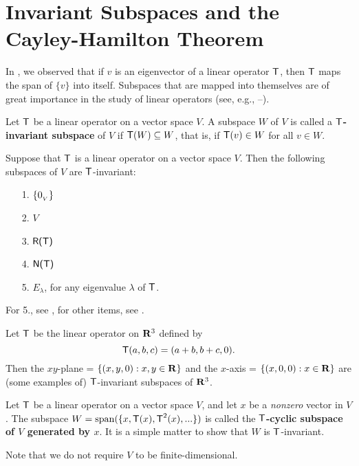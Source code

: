 \section{Invariant Subspaces and the Cayley-Hamilton Theorem} \label{sec 5.4}

In , we observed that if \(v\) is an eigenvector of a linear operator \(\textsf{T}\), then \(\textsf{T}\) maps the span of \(\{ v \}\) into itself.
Subspaces that are mapped into themselves are of great importance in the study of linear operators (see, e.g., --).

\begin{definition} \label{def 5.14}
Let \(\textsf{T}\) be a linear operator on a vector space \(V\).
A subspace \(W\) of \(V\) is called a \textbf{\(\textsf{T}\)-invariant subspace} of \(V\) if \(\textsf{T}(W) \subseteq W\), that is, if
\(\textsf{T}(v) \in W\) for all \(v \in W\).
\end{definition}

\begin{example} \label{example 5.4.1}
Suppose that \(\textsf{T}\) is a linear operator on a vector space \(V\).
Then the following subspaces of \(V\) are \(\textsf{T}\)-invariant:
\begin{enumerate}
\item[1.] \(\{ 0_{_V} \}\)
\item[2.] \(V\)
\item[3.] \(\textsf{R(T)}\)
\item[4.] \(\textsf{N(T)}\)
\item[5.] \(E_{\lambda}\), for any eigenvalue \(\lambda\) of \(\textsf{T}\).
\end{enumerate}

For 5., see , for other items, see .
\end{example}

\begin{example} \label{example 5.4.2}
Let \(\textsf{T}\) be the linear operator on \(\mathbf{R}^3\) defined by
\[
    \textsf{T}(a, b, c) = (a + b, b + c, 0).
\]
Then the \(xy\)-plane = \(\{ (x, y, 0): x, y \in \mathbf{R} \}\) and the \(x\)-axis = \(\{ (x, 0, 0): x \in \mathbf{R}\}\) are (some examples of) \(\textsf{T}\)-invariant subspaces of \(\mathbf{R}^3\).
\end{example}

\begin{additional definition} \label{adef 5.5}
Let \(\textsf{T}\) be a linear operator on a vector space \(V\), and let \(x\) be a \emph{nonzero} vector in \(V\).
The subspace \(W = \operatorname{span}(\{ x, \textsf{T}(x), \textsf{T}^2(x), ... \})\) is called the \textbf{\(\textsf{T}\)-cyclic subspace of \(V\) generated by \(x\)}.
It is a simple matter to show that \(W\) is \(\textsf{T}\)-invariant.

Note that we do not require \(V\) to be finite-dimensional.
\end{additional definition}

